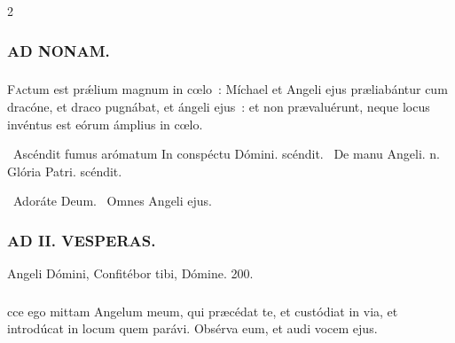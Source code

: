 \documentclass[9pt,twoside]{extarticle}
\begin{document}
\begin{multicols}{2}
{{\subsubsection*{\center \textsc{AD NONAM.}}
\subsubsection*{}
\lettrine{F}actum est prǽlium magnum in cœlo~: Míchael et Angeli ejus præliabántur cum dracóne, et draco pugnábat, et ángeli ejus~: et non prævaluérunt, neque locus invéntus est eórum ámplius in cœlo.

\begin{tightlist}{}
\item {}~Ascéndit fumus arómatum \textred{*} In conspéctu Dómini. scéndit. ~De manu Angeli. n. Glória Patri. scéndit.
\item {}~Adoráte Deum. ~Omnes Angeli ejus.
\end{tightlist}

\subsubsection*{\center \textsc{AD II. VESPERAS.}}
\begin{tightlist}{}
\item {} Angeli Dómini,  Confitébor tibi, Dómine. 200.
\end{tightlist}

\subsubsection*{}
cce ego mittam Angelum meum, qui præcédat te, et custódiat in via, et introdúcat in locum quem parávi. Obsérva eum, et audi vocem ejus.

}}
\end{multicols}
\end{document}
